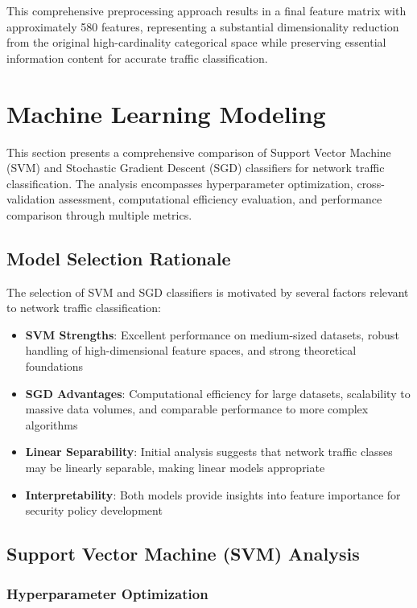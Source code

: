 \documentclass[12pt,a4paper]{article}
\begin{document}
This comprehensive preprocessing approach results in a final feature matrix with approximately 580 features, representing a substantial dimensionality reduction from the original high-cardinality categorical space while preserving essential information content for accurate traffic classification.

\section{Machine Learning Modeling}

This section presents a comprehensive comparison of Support Vector Machine (SVM) and Stochastic Gradient Descent (SGD) classifiers for network traffic classification. The analysis encompasses hyperparameter optimization, cross-validation assessment, computational efficiency evaluation, and performance comparison through multiple metrics.

\subsection{Model Selection Rationale}

The selection of SVM and SGD classifiers is motivated by several factors relevant to network traffic classification:

\begin{itemize}
    \item \textbf{SVM Strengths}: Excellent performance on medium-sized datasets, robust handling of high-dimensional feature spaces, and strong theoretical foundations
    \item \textbf{SGD Advantages}: Computational efficiency for large datasets, scalability to massive data volumes, and comparable performance to more complex algorithms
    \item \textbf{Linear Separability}: Initial analysis suggests that network traffic classes may be linearly separable, making linear models appropriate
    \item \textbf{Interpretability}: Both models provide insights into feature importance for security policy development
\end{itemize}

\subsection{Support Vector Machine (SVM) Analysis}

\subsubsection{Hyperparameter Optimization}
\end{document}
